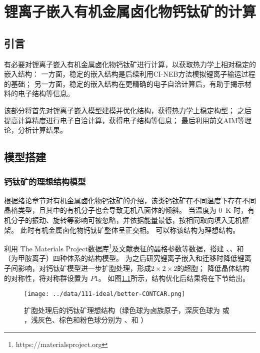 \chapter{锂离子嵌入有机金属卤化物钙钛矿的计算}

\section{引言}

有必要对锂离子嵌入有机金属卤化物钙钛矿进行计算，以获取热力学上相对稳定的嵌入结构：
一方面，稳定的嵌入结构是后续利用CI-NEB方法模拟锂离子输运过程的基础；
另一方面，稳定的嵌入结构在更精确的电子自洽计算后，有助于揭示材料的电子结构等信息。

该部分将首先对锂离子嵌入模型建模并优化结构，获得热力学上稳定构型；
之后提高计算精度进行电子自洽计算，获得电子结构等信息；
最后利用前文AIM等理论，分析计算结果。

\section{模型搭建}

\subsection{钙钛矿的理想结构模型}

根据绪论章节对有机金属卤化物钙钛矿的介绍，该类钙钛矿在不同温度下存在不同晶格类型，且其中的有机分子也会导致无机八面体的倾斜。
当温度为 \SI{0}{K} 时，有机分子的振动、旋转等影响可被忽略，并依据能量最低，按相同取向填入无机框架。
此时有机金属卤化物钙钛矿整体呈正交相。
可以称该结构为理想结构。

利用 The Materials Project数据库\footnote{https://materialsproject.org}及文献\cite{yinMetalChloridePerovskite2020}表征的晶格参数等数据，搭建 、、和  （为甲胺离子）四种体系的结构模型。
为之后研究锂离子嵌入和迁移时降低锂离子间影响，对钙钛矿模型进一步扩胞处理，形成$2\times2\times2$的超胞；
降低晶体结构的对称性，将对称群设置为 $P1$。
如图\ref{fig:ideal-struc}所示，结构优化后结果将在下节给出。

\begin{figure}[ht]
    \centering
    \texttt{[image: ../data/111-ideal/better-CONTCAR.png]}
    \caption{扩胞处理后的钙钛矿理想结构（绿色球为卤族原子，深灰色球为 或 ，浅灰色、棕色和粉色球分别为 、和 ）}
    \label{fig:ideal-struc}
\end{figure}

